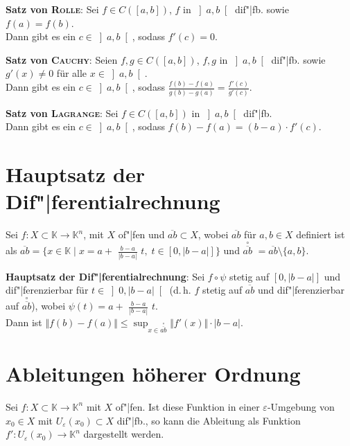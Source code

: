\textbf{Satz von \textsc{Rolle}}:
Sei $f \in C([a,b])$, $f$ in $\left]a,b\right[$ dif"|fb. sowie
$f(a) = f(b)$. \\
Dann gibt es ein $c \in \left]a,b\right[$, sodass $f'(c) = 0$.

\textbf{Satz von \textsc{Cauchy}}:
Seien $f,g \in C([a,b])$, $f,g$ in $\left]a,b\right[$ dif"|fb. sowie
$g'(x) \not= 0$ für alle $x \in \left]a,b\right[$. \\
Dann gibt es ein $c \in \left]a,b\right[$, sodass
{\large $\frac{f(b) - f(a)}{g(b) - g(a)} = \frac{f'(c)}{g'(c)}$}.

\textbf{Satz von \textsc{Lagrange}}:
Sei $f \in C([a,b])$ in $\left]a,b\right[$ dif"|fb. \\
Dann gibt es ein $c \in \left]a,b\right[$, sodass
$f(b) - f(a) = (b - a) \cdot f'(c)$.

\section{%
    Hauptsatz der Dif"|ferentialrechnung%
}

Sei $f: X \subset \mathbb{K} \rightarrow \mathbb{K}^n$, mit $X$ of"|fen und
$\overline{ab} \subset X$, wobei $\overline{ab}$ für $a, b \in X$ definiert ist
als $\overline{ab} = \{x \in \mathbb{K} \;|\;
x = a +$ {\large $\frac{b - a}{|b - a|}$} $t,\; t \in [0, |b - a|]\}$ und
{\scriptsize $\overset{\circ}{\overline{ab}}$}
$= \overline{ab} \setminus \{a, b\}$.

\textbf{Hauptsatz der Dif"|ferentialrechnung}:
Sei $f \circ \psi$ stetig auf $[0, |b - a|]$ und dif"|ferenzierbar für
$t \in \left]0, |b - a|\right[$ (d.\,h. $f$ stetig auf $\overline{ab}$ und
dif"|ferenzierbar auf {\scriptsize $\overset{\circ}{\overline{ab}}$}), wobei
$\psi(t) = a +$ {\large $\frac{b - a}{|b - a|}$} $t$. \\
Dann ist $\Vert f(b) - f(a) \Vert \le
\sup_{x \in \overset{\circ}{\overline{ab}}} \Vert f'(x) \Vert \cdot |b - a|$.

\section{%
    Ableitungen höherer Ordnung%
}

Sei $f: X \subset \mathbb{K} \rightarrow \mathbb{K}^n$ mit $X$ of"|fen.
Ist diese Funktion in einer $\varepsilon$-Umgebung von $x_0 \in X$
mit $U_\varepsilon(x_0) \subset X$ dif"|fb., so kann die Ableitung
als Funktion $f': U_\varepsilon(x_0) \rightarrow \mathbb{K}^n$ dargestellt
werden.

